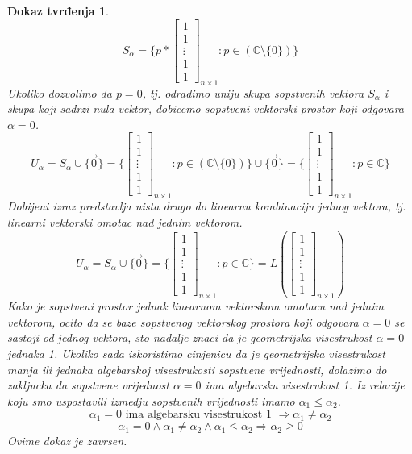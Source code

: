 \documentclass[11pt]{article}
\newtheorem*{custom_proof}{Dokaz tvrđenja}
\begin{document}
\begin{custom_proof}
	\[
	S_{\alpha} = \{p *
	\begin{bmatrix} 
	1 \\ 1 \\ \vdots \\ 1 \\ 1
	\end{bmatrix}_{n \times 1} : p \in (\mathbb{C} \setminus \{0\}) \} 
	\]
	Ukoliko dozvolimo da $p=0$, tj. odradimo uniju skupa sopstvenih vektora $S_{\alpha}$ i skupa koji sadrzi nula vektor, dobicemo sopstveni vektorski prostor koji odgovara $\alpha = 0$.
	\[
	U_{\alpha} = S_{\alpha} \cup \{\vec{0}\}= \{
	\begin{bmatrix} 
	1 \\ 1 \\ \vdots \\ 1 \\ 1
	\end{bmatrix}_{n \times 1}  : p \in (\mathbb{C} \setminus \{0\}) \} \cup \{\vec{0}\}= \{
	\begin{bmatrix} 
	1 \\ 1 \\ \vdots \\ 1 \\ 1
	\end{bmatrix}_{n \times 1} :  p \in \mathbb{C}\} 
	\]
	Dobijeni izraz predstavlja nista drugo do linearnu kombinaciju jednog vektora, tj. linearni vektorski omotac nad jednim vektorom.
	\[
	U_{\alpha} = S_{\alpha} \cup \{\vec{0}\}= \{
	\begin{bmatrix} 
	1 \\ 1 \\ \vdots \\ 1 \\ 1
	\end{bmatrix}_{n \times 1} :  p \in \mathbb{C}\} = L (\begin{bmatrix} 
	1 \\ 1 \\ \vdots \\ 1 \\ 1
	\end{bmatrix}_{n \times 1})
	\]
	Kako je sopstveni prostor jednak linearnom vektorskom omotacu nad jednim vektorom, ocito da se baze sopstvenog vektorskog prostora koji odgovara $\alpha = 0$ se sastoji od jednog vektora, sto nadalje znaci da je geometrijska visestrukost $\alpha = 0$ jednaka 1.
	Ukoliko sada iskoristimo cinjenicu da je geometrijska visestrukost manja ili jednaka algebarskoj visestrukosti sopstvene vrijednosti, dolazimo do zakljucka da sopstvene vrijednost $\alpha = 0 $ ima algebarsku visestrukost 1. Iz relacije koju smo uspostavili izmedju sopstvenih vrijednosti imamo $\alpha_1 \leq \alpha_2$.
	\[
	\alpha_1 = 0 \text{ ima algebarsku visestrukost 1 } \Rightarrow \alpha_1 \neq \alpha_2
	\]
	\[
	\alpha_1 = 0  \land \alpha_1 \neq \alpha_2 \land \alpha_1 \leq \alpha_2 \Rightarrow \alpha_2 \ge 0
	\]
	Ovime dokaz je zavrsen.
	\end{custom_proof}
	
\end{document}
